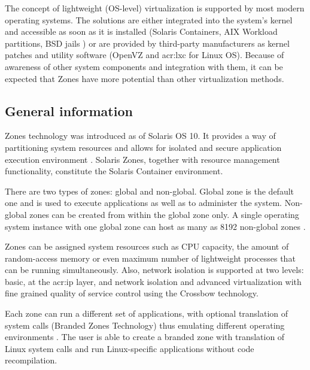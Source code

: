 \documentclass[11pt,openany]{book}
\begin{document}
      The concept of lightweight (OS-level) virtualization is supported by most modern operating systems. The solutions
      are either integrated into the system's kernel and accessible as soon as it is installed (Solaris Containers, AIX
      Workload partitions, BSD jails \cite{kamp}) or are provided by third-party manufacturers as kernel patches and
      utility software (OpenVZ and \gls{acr:lxc} for Linux OS). Because of awareness of other system components and
      integration with them, it can be expected that Zones have more potential than other virtualization methods.


      \subsection{General information}
      \label{sub:}

        Zones technology was introduced as of Solaris OS 10. It provides a way of partitioning system resources and
        allows for isolated and secure application execution environment \cite{sag}. Solaris Zones, together with
        resource management functionality, constitute the Solaris Container environment.

        There are two types of zones: global and non-global. Global zone is the default one and is used to execute
        applications as well as to administer the system. Non-global zones can be created from within the global zone
        only. A single operating system instance with one global zone can host as many as 8192 non-global zones
        \cite{sag}.

        Zones can be assigned system resources such as CPU capacity, the amount of random-access memory or even maximum
        number of lightweight processes that can be running simultaneously. Also, network isolation is supported at two
        levels: basic, at the \gls{acr:ip} layer, and network isolation and advanced virtualization with fine grained
        quality of service control using the Crossbow technology.

        Each zone can run a different set of applications, with optional translation of system calls (Branded Zones
        Technology) thus emulating different operating environments \cite{sag}. The user is able to create a branded
        zone with translation of Linux system calls and run Linux-specific applications without code recompilation.
\end{document}
